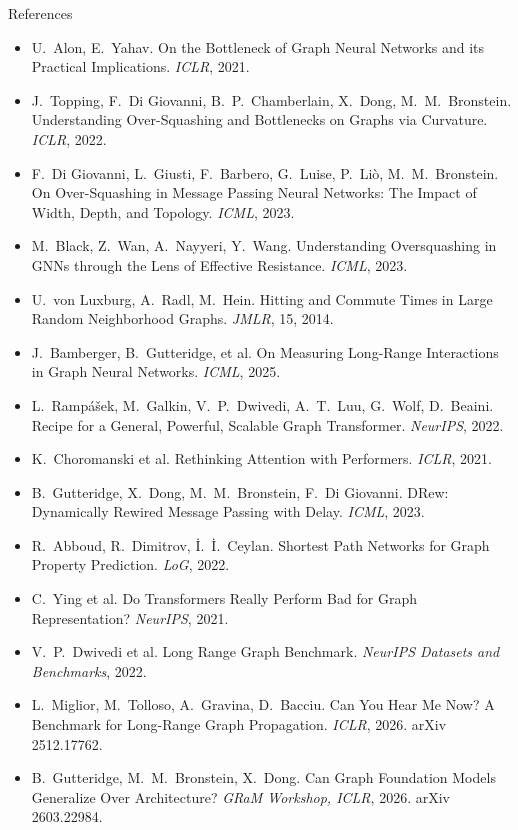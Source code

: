 \documentclass[aspectratio=169,10pt]{beamer}
\begin{document}
\begin{frame}[allowframebreaks]{References}
  \scriptsize
  \begin{itemize}
    \item U.~Alon, E.~Yahav. On the Bottleneck of Graph Neural Networks and its Practical Implications. \emph{ICLR}, 2021.
    \item J.~Topping, F.~Di Giovanni, B.~P.~Chamberlain, X.~Dong, M.~M.~Bronstein. Understanding Over-Squashing and Bottlenecks on Graphs via Curvature. \emph{ICLR}, 2022.
    \item F.~Di Giovanni, L.~Giusti, F.~Barbero, G.~Luise, P.~Liò, M.~M.~Bronstein. On Over-Squashing in Message Passing Neural Networks: The Impact of Width, Depth, and Topology. \emph{ICML}, 2023.
    \item M.~Black, Z.~Wan, A.~Nayyeri, Y.~Wang. Understanding Oversquashing in GNNs through the Lens of Effective Resistance. \emph{ICML}, 2023.
    \item U.~von Luxburg, A.~Radl, M.~Hein. Hitting and Commute Times in Large Random Neighborhood Graphs. \emph{JMLR}, 15, 2014.
    \item J.~Bamberger, B.~Gutteridge, et al. On Measuring Long-Range Interactions in Graph Neural Networks. \emph{ICML}, 2025.
    \item L.~Rampášek, M.~Galkin, V.~P.~Dwivedi, A.~T.~Luu, G.~Wolf, D.~Beaini. Recipe for a General, Powerful, Scalable Graph Transformer. \emph{NeurIPS}, 2022.
    \item K.~Choromanski et al. Rethinking Attention with Performers. \emph{ICLR}, 2021.
    \item B.~Gutteridge, X.~Dong, M.~M.~Bronstein, F.~Di Giovanni. DRew: Dynamically Rewired Message Passing with Delay. \emph{ICML}, 2023.
    \item R.~Abboud, R.~Dimitrov, İ.~İ.~Ceylan. Shortest Path Networks for Graph Property Prediction. \emph{LoG}, 2022.
    \item C.~Ying et al. Do Transformers Really Perform Bad for Graph Representation? \emph{NeurIPS}, 2021.
    \item V.~P.~Dwivedi et al. Long Range Graph Benchmark. \emph{NeurIPS Datasets and Benchmarks}, 2022.
    \item L.~Miglior, M.~Tolloso, A.~Gravina, D.~Bacciu. Can You Hear Me Now? A Benchmark for Long-Range Graph Propagation. \emph{ICLR}, 2026. arXiv 2512.17762.
    \item B.~Gutteridge, M.~M.~Bronstein, X.~Dong. Can Graph Foundation Models Generalize Over Architecture? \emph{GRaM Workshop, ICLR}, 2026. arXiv 2603.22984.

\end{itemize}
\end{frame}
\end{document}
